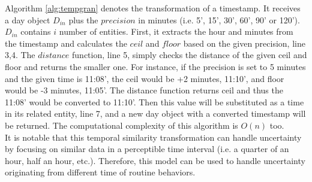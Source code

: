 \documentclass{sig-alternate}
\begin{document}
Algorithm \ref{alg:tempgran} denotes the transformation of a timestamp. It receives a day object $D_{in}$ plus the $precision$ in minutes (i.e. 5', 15', 30', 60', 90' or 120'). $D_{in}$ contains $i$ number of entities. First, it extracts the hour and minutes from the timestamp and calculates the $ceil$ and $floor$ based on the given precision, line 3,4. The $distance$ function, line 5, simply checks the distance of the given ceil and floor and returns the smaller one. For instance, if the precision is set to 5 minutes and the given time is 11:08', the ceil would be +2 minutes, 11:10', and floor would be -3 minutes, 11:05'. The distance function returns ceil and thus the 11:08'  would be converted to 11:10'. Then this value will be substituted as a time in its related entity, line 7, and a new day object with a converted timestamp will be returned. The computational complexity of this algorithm is $O(n)$ too.\\
It is notable that this temporal similarity transformation can handle uncertainty by focusing on similar data in a perceptible time interval (i.e. a quarter of an hour, half an hour, etc.). Therefore, this model can be used to handle uncertainty originating from different time of routine behaviors.
\end{document}

